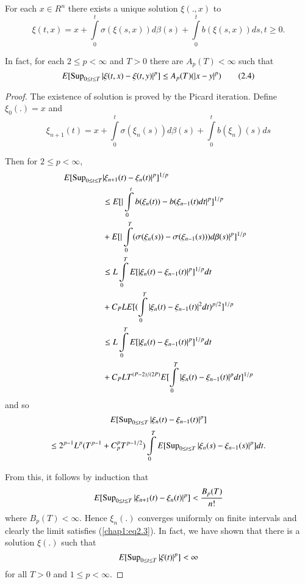 \setcounter{theorem}{1}
\begin{theorem} %
For each $ x \in R^n$ there exists a unique solution $\xi(.,x)$ to  
\begin{equation*}
\xi(t,x) = x + \int \limits^t_0 \sigma(\xi(s,x)) d \beta(s) + \int
\limits^t_0 b(\xi(s,x))ds, t \geq 0. \tag{2.3}\label{chap1:eq2.3}    
\end{equation*}

In fact, for each $2 \leq p < \infty$ and $T>0$ there are $A_p(T) <
\infty$ such that  
\begin{equation*}
E[\operatorname{Sup} \limits_{0 \leq t \leq T}| \xi (t,x) - \xi(t,y)|^p] \leq A_p(T)
(|x-y|^p) \tag{2.4}\label{chap1:eq2.4}   
\end{equation*}
\end{theorem}

\begin{proof}
The existence of solution is proved by the Picard iteration. Define
$\xi_0(.) =x$ and  
$$
\xi_{n+1}(t) = x + \int \limits^t_0  \sigma(\xi_n(s)) d \beta (s) +
\int \limits^t_0 b(\xi_n) (s)ds 
$$

Then for $2 \leq p < \infty$, 
\begin{align*}
 E[\operatorname{Sup}\limits_{0 \leq t \leq T} &| \xi_{n+1}(t) - \xi_n(t)|^p]^{1/p}\\ 
& \leq E[|\int\limits^t_0  b(\xi_n (t))-
   b(\xi_{n-1}(t)dt|^p]^{1/p}\\ 
& + E[|\int\limits^T_0  (\sigma(\xi_n (s)) - \sigma(\xi_{n-1}(s))) d
   \beta(s)|^p]^{1/p}\\ 
& \leq L \int\limits^T_0 E[|\xi_n (t) - \xi_{n-1}(t) |^p]^{1/p}dt\\ 
& + C_P L E[(\int\limits^T_0|\xi_n(t)- \xi_{n-1}(t)|^2 dt)^{p/2}]^{1/p}\\
& \leq L \int \limits^T_0 E[|\xi_n (t) - \xi_{n-1}(t) |^p]^{1/p}dt\\
& + C_P L T^{(P-2)/(2P)} E[ \int\limits^T_0 |\xi_n (t) - \xi_{n-1}(t)
     |^p dt]^{1/p} 
\end{align*}\pageoriginale
and so 
$$
E[ \operatorname{Sup}_{0 \leq t \leq T}| \xi_n (t) - \xi_{n-1}(t) |^p ] 
$$
$$
\leq 2^{p-1} L^p(T^{p-1}+ C^p_p T^{p-1/2}) \int \limits^T_0 E[ \operatorname{Sup}_{0
    \leq t \leq T}| \xi_n (s) - \xi_{n-1}(s) |^p ]dt. 
$$

From this, it follows by induction that 
$$
E[ \operatorname{Sup}_{0 \leq t \leq T}| \xi_{n+1} (t) - \xi_{n}(t) |^p ]<
\frac{B_p(T)}{n!} 
$$
where $B_p(T) < \infty$. Hence $\xi_n(.)$ converges uniformly on
finite intervals and clearly the limit satisfies
(\ref{chap1:eq2.3}). In fact, we 
have shown that there is a solution $\xi(.)$ such that  
$$
E[ \operatorname{Sup}_{0 \leq t \leq T}| \xi (t)  |^p ] < \infty
$$
for all $T> 0$ and $1 \leq p < \infty$.


\end{proof}
